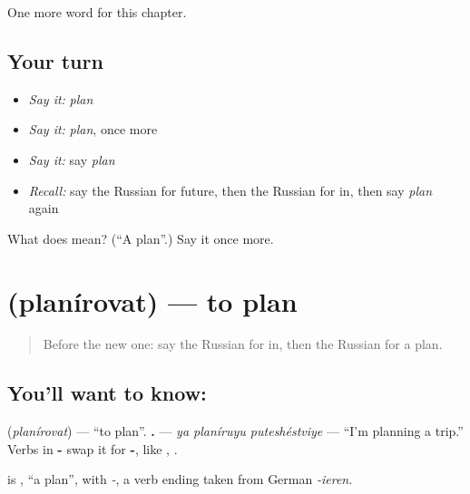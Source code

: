 \begin{grammarlens}[title={What you've built}]
One more word for this chapter.
\end{grammarlens}

\subsection*{Your turn}
\begin{itemize}
\raggedright
  \item \emph{Say it:} \emph{plan}
  \item \emph{Say it:} \emph{plan}, once more
  \item \emph{Say it:} say \emph{plan}
  \item \emph{Recall:} say the Russian for future, then the Russian for in, then say \emph{plan} again
\end{itemize}

\begin{tcolorbox}[breakable,colback=teal!4,colframe=teal!35!black,title={Before you move on}]
What does  mean? (\textquotedblleft{}A plan\textquotedblright{}.) Say it once more.
\end{tcolorbox}
\section[\texorpdfstring{\ru{планировать} (planírovat)}{планировать (planírovat)}]{ (planírovat) — to plan}

\label{lesson:RU-C138-planirovat}



\begin{quote}
Before the new one: say the Russian for in, then the Russian for a plan.
\end{quote}

\subsection*{You'll want to know: }
\textbf{} (\emph{planírovat}) — \textquotedblleft{}to plan\textquotedblright{}. \textbf{  .} — \emph{ya planíruyu puteshéstviye} — \textquotedblleft{}I'm planning a trip.\textquotedblright{} Verbs in \textbf{-} swap it for \textbf{-}, like \textbf{}, \textbf{}.

\begin{cousinweb}
\textbf{} is \emph{}, \textquotedblleft{}a plan\textquotedblright{}, with \emph{-}, a verb ending taken from German \emph{-ieren}.
\end{cousinweb}

